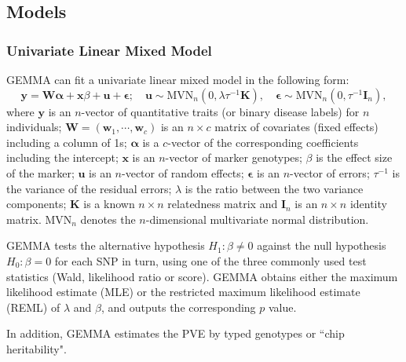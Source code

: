 \documentclass[11pt]{article}
\newcommand{\bx}{\mathbf{x}}
\newcommand{\by}{\mathbf{y}}
\newcommand{\bu}{\mathbf{u}}
\newcommand{\bw}{\mathbf{w}}
\newcommand{\bK}{\mathbf{K}}
\newcommand{\bW}{\mathbf{W}}
\newcommand{\bI}{\mathbf{I}}
\newcommand{\bepsilon}{\boldsymbol\epsilon}
\newcommand{\balpha}{\boldsymbol\alpha}
\begin{document}
\subsection{Models}
\subsubsection{Univariate Linear Mixed Model}
GEMMA can fit a univariate linear mixed model in the following form:
%
\begin{equation*}
\by=\bW \balpha+\bx\beta+\bu+\bepsilon;   \quad \bu\sim \mbox{MVN}_n(0, \lambda \tau^{-1} \bK), \quad \bepsilon \sim \mbox{MVN}_n(0, \tau^{-1} \bI_n),
\end{equation*}
%
where $\by$ is an $n$-vector of quantitative traits (or binary disease labels) for $n$ individuals; $\bW=(\bw_1, \cdots, \bw_c)$ is an $n\times c$ matrix of covariates (fixed effects) including a column of 1s; $\boldsymbol \alpha$ is a $c$-vector of the corresponding coefficients including the intercept; $\bx$ is an $n$-vector of marker genotypes; $\beta$ is the effect size of the marker; $\bu$ is an $n$-vector of random effects; $\bepsilon$ is an $n$-vector of errors; $\tau^{-1}$ is the variance of the residual errors; $\lambda$ is the ratio between the two variance components; $\bK$ is a known $n\times n$ relatedness matrix and $\bI_n$ is an $n\times n$ identity matrix. $\mbox{MVN}_n$ denotes the $n$-dimensional multivariate normal distribution.

GEMMA tests the alternative hypothesis $H_1: \beta\neq 0$ against the null hypothesis $H_0: \beta=0$ for each SNP in turn, using one of the three commonly used test statistics (Wald, likelihood ratio or score). GEMMA obtains either the maximum likelihood estimate (MLE) or the restricted maximum likelihood estimate (REML) of $\lambda$ and $\beta$, and outputs the corresponding $p$ value.

In addition, GEMMA estimates the PVE by typed genotypes or ``chip heritability".
\end{document}
